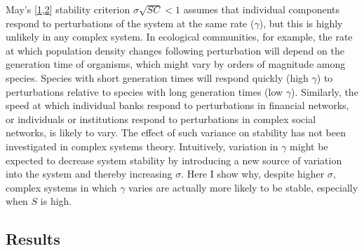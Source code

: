\documentclass[]{article}
\begin{document}
May's
{[}\protect\hyperlink{ref-May1972}{1},\protect\hyperlink{ref-Allesina2012}{2}{]}
stability criterion \(\sigma\sqrt{SC} < 1\) assumes that individual
components respond to perturbations of the system at the same rate
(\(\gamma\)), but this is highly unlikely in any complex system. In
ecological communities, for example, the rate at which population
density changes following perturbation will depend on the generation
time of organisms, which might vary by orders of magnitude among
species. Species with short generation times will respond quickly (high
\(\gamma\)) to perturbations relative to species with long generation
times (low \(\gamma\)). Similarly, the speed at which individual banks
respond to perturbations in financial networks, or individuals or
institutions respond to perturbations in complex social networks, is
likely to vary. The effect of such variance on stability has not been
investigated in complex systems theory. Intuitively, variation in
\(\gamma\) might be expected to decrease system stability by introducing
a new source of variation into the system and thereby increasing
\(\sigma\). Here I show why, despite higher \(\sigma\), complex systems
in which \(\gamma\) varies are actually more likely to be stable,
especially when \(S\) is high.

\subsection{Results}\label{results}
\end{document}
